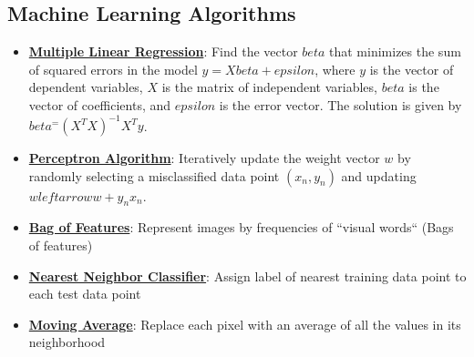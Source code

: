 \documentclass{article}%
\begin{document}
\subsection{Machine Learning Algorithms}%
\label{subsec:MachineLearningAlgorithms}%
\begin{itemize}[leftmargin=*]%
\item \href{https://purdue.brightspace.com/d2l/common/assets/pdfjs-d2l-dist/1.0.14-legacy/web/viewer.html?file=\%2Fcontent\%2Fenforced\%2F1095467-wl.202510.CS.24300.001\%2F05L2-ML Basics.pdf\%3Fou\%3D1095467\&lang=en-us\&container=d2l-fileviewer-rendered-pdf\&fullscreen=d2l-fileviewer-rendered-pdf-dialog\&height=667#page=11}{\textbf{Multiple Linear Regression}}: Find the vector $ beta$ that minimizes the sum of squared errors in the model $y = X beta +  epsilon$, where $y$ is the vector of dependent variables, $X$ is the matrix of independent variables, $ beta$ is the vector of coefficients, and $ epsilon$ is the error vector. The solution is given by $ beta^ = (X^TX)^{-1}X^Ty$.%
\item \href{https://purdue.brightspace.com/d2l/common/assets/pdfjs-d2l-dist/1.0.14-legacy/web/viewer.html?file=\%2Fcontent\%2Fenforced\%2F1095467-wl.202510.CS.24300.001\%2F05L2-ML Basics.pdf\%3Fou\%3D1095467\&lang=en-us\&container=d2l-fileviewer-rendered-pdf\&fullscreen=d2l-fileviewer-rendered-pdf-dialog\&height=667#page=30}{\textbf{Perceptron Algorithm}}: Iteratively update the weight vector $w$ by randomly selecting a misclassified data point $(x_n, y_n)$ and updating $w  leftarrow w + y_nx_n$.%
\item \href{https://purdue.brightspace.com/d2l/common/assets/pdfjs-d2l-dist/1.0.14-legacy/web/viewer.html?file=\%2Fcontent\%2Fenforced\%2F1095467-wl.202510.CS.24300.001\%2F07L2-Vision.pdf\%3Fou\%3D1095467\&lang=en-us\&container=d2l-fileviewer-rendered-pdf\&fullscreen=d2l-fileviewer-rendered-pdf-dialog\&height=667#page=16}{\textbf{Bag of Features}}: Represent images by frequencies of ``visual words`` (Bags of features)%
\item \href{https://purdue.brightspace.com/d2l/common/assets/pdfjs-d2l-dist/1.0.14-legacy/web/viewer.html?file=\%2Fcontent\%2Fenforced\%2F1095467-wl.202510.CS.24300.001\%2F07L2-Vision.pdf\%3Fou\%3D1095467\&lang=en-us\&container=d2l-fileviewer-rendered-pdf\&fullscreen=d2l-fileviewer-rendered-pdf-dialog\&height=667#page=30}{\textbf{Nearest Neighbor Classifier}}: Assign label of nearest training data point to each test data point%
\item \href{https://purdue.brightspace.com/d2l/common/assets/pdfjs-d2l-dist/1.0.14-legacy/web/viewer.html?file=\%2Fcontent\%2Fenforced\%2F1095467-wl.202510.CS.24300.001\%2F07L2-Vision.pdf\%3Fou\%3D1095467\&lang=en-us\&container=d2l-fileviewer-rendered-pdf\&fullscreen=d2l-fileviewer-rendered-pdf-dialog\&height=667#page=38}{\textbf{Moving Average}}: Replace each pixel with an average of all the values in its neighborhood%

\end{itemize}
\end{document}
